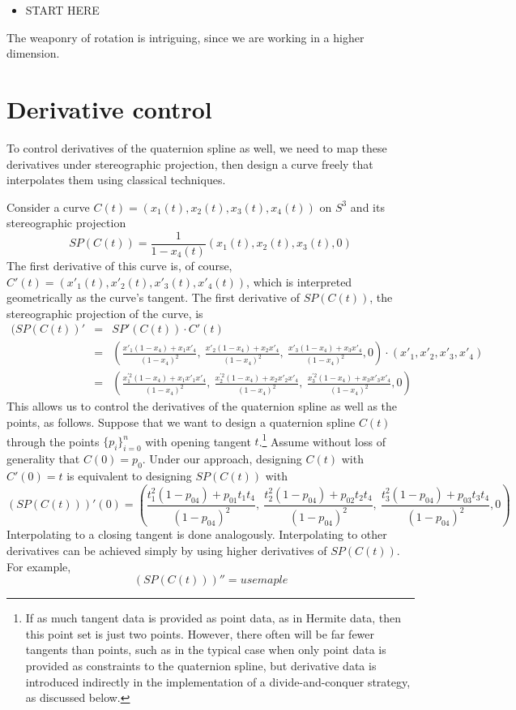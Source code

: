 \documentclass[12pt]{article}
\begin{document}
\begin{itemize}
\item START HERE
\end{itemize}

The weaponry of rotation is intriguing, since we are working in a higher dimension.

\section{Derivative control}

To control derivatives of the quaternion spline as well, 
we need to map these derivatives under stereographic projection,
then design a curve freely that interpolates them using classical techniques.

Consider a curve $C(t) = (x_1(t),x_2(t),x_3(t),x_4(t))$ on $S^3$
and its stereographic projection 
\[
SP(C(t)) = \frac{1}{1-x_4(t)} (x_1(t),x_2(t),x_3(t),0)
\]
The first derivative of this curve is, of course,
$C'(t) = (x'_1(t),x'_2(t),x'_3(t),x'_4(t))$,
which is interpreted geometrically as the curve's tangent.
The first derivative of $SP(C(t))$, the stereographic projection of the curve, is 
\begin{eqnarray*}
(SP(C(t))' & = & SP'(C(t)) \cdot C'(t) \\
           & = & (\frac{x'_1(1-x_4) + x_1x'_4}{(1-x_4)^2},\ 
                  \frac{x'_2(1-x_4) + x_2x'_4}{(1-x_4)^2},\  
                  \frac{x'_3(1-x_4) + x_3x'_4}{(1-x_4)^2}, 0) 
		  \cdot (x'_1, x'_2, x'_3, x'_4) \\
           & = & (\frac{x^{'2}_1(1-x_4) + x_1x'_1x'_4}{(1-x_4)^2},\ 
                  \frac{x^{'2}_2(1-x_4) + x_2x'_2x'_4}{(1-x_4)^2},\  
                  \frac{x^{'2}_3(1-x_4) + x_3x'_3x'_4}{(1-x_4)^2}, 0)
\end{eqnarray*}
%
This allows us to control the derivatives of the quaternion spline as well
as the points, as follows.
Suppose that we want to design a quaternion spline $C(t)$ through the points
$\{p_i\}_{i=0}^n$ with opening tangent $t$.\footnote{If as much tangent 
  data is provided as point data, as in Hermite data,
  then this point set is just two points.
  However, there often will be far fewer tangents than points, such as in the typical case
  when only point data is provided as constraints to the quaternion spline,
  but derivative data is introduced indirectly in the implementation of 
  a divide-and-conquer strategy, as discussed below.}
Assume without loss of generality that $C(0) = p_0$.
Under our approach,
designing $C(t)$ with $C'(0) = t$ is equivalent to 
designing $SP(C(t))$ with 
\[
(SP(C(t)))'(0) = (\frac{t^{2}_1(1-p_{04}) + p_{01}t_1t_4}{(1-p_{04})^2},\ 
                  \frac{t^{2}_2(1-p_{04}) + p_{02}t_2t_4}{(1-p_{04})^2},\  
                  \frac{t^{2}_3(1-p_{04}) + p_{03}t_3t_4}{(1-p_{04})^2}, 0)
\]
Interpolating to a closing tangent is done analogously.
Interpolating to other derivatives can be achieved simply by using higher derivatives
of $SP(C(t))$.
For example, 
\[
(SP(C(t)))'' = use maple
\]
\end{document}
